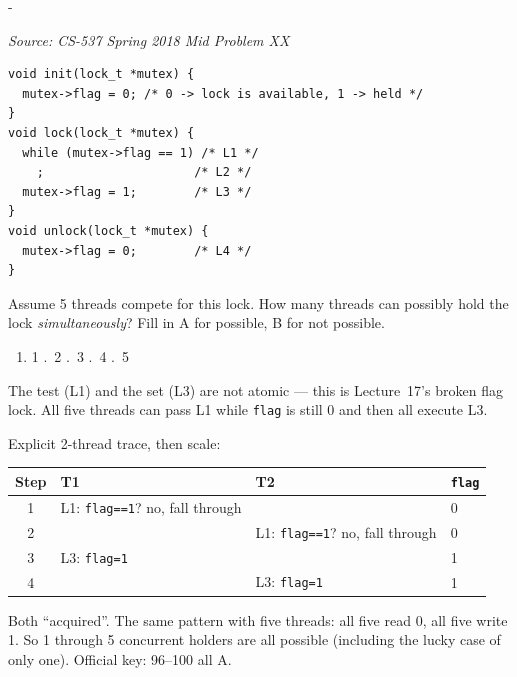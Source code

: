 \documentclass[11pt,a4paper]{article}
\makeatletter
\newcommand{\keepspace}[1]{\par\penalty-100\begingroup
  \setlength{\dimen@}{#1}\dimen@ii\pagegoal\advance\dimen@ii-\pagetotal
  \ifdim\dimen@>\dimen@ii\ifdim\dimen@ii>\z@\vfil\fi\break\fi\endgroup}
\newcounter{qn}[section]
\newenvironment{Qn}[4]{%
  \refstepcounter{qn}\keepspace{7\baselineskip}%
  \begin{tcolorbox}[qboxstyle, title={Q\thesection.\theqn\ \ [#1 \textbar\ #2]\ \ #4}]%
  {\footnotesize\color{g3}\textit{Source: #3}}\par\smallskip%
}{%
  \end{tcolorbox}%
}
\newenvironment{Sol}{%
  \begin{tcolorbox}[sboxstyle, title={Solution}]%
}{%
  \end{tcolorbox}\vspace{0.35em}%
}
\makeatother
\begin{document}
\begin{Qn}{Hard}{Lect 17}{CS-537 Spring 2018 Mid Problem XX}{Broken flag lock: how many threads get in?}
\begin{lstlisting}[numbers=none]
void init(lock_t *mutex) {
  mutex->flag = 0; /* 0 -> lock is available, 1 -> held */
}
void lock(lock_t *mutex) {
  while (mutex->flag == 1) /* L1 */
    ;                     /* L2 */
  mutex->flag = 1;        /* L3 */
}
void unlock(lock_t *mutex) {
  mutex->flag = 0;        /* L4 */
}
\end{lstlisting}

Assume 5 threads compete for this lock. How many threads can possibly hold the lock \emph{simultaneously}? Fill in A for possible, B for not possible.

\begin{enumerate}
\item[96.] 1 .~2 .~3 .~4 .~5
\end{enumerate}
\end{Qn}
\begin{Sol}
The test (L1) and the set (L3) are not atomic --- this is Lecture~17's broken flag lock. All five threads can pass L1 while \texttt{flag} is still 0 and then all execute L3.

Explicit 2-thread trace, then scale:

\begin{center}
\begin{tabular}{c|l|l|l}
Step & T1 & T2 & \texttt{flag} \\
\hline
1 & L1: \texttt{flag==1}? no, fall through & & 0 \\
2 & & L1: \texttt{flag==1}? no, fall through & 0 \\
3 & L3: \texttt{flag=1} & & 1 \\
4 & & L3: \texttt{flag=1} & 1 \\
\end{tabular}
\end{center}

Both ``acquired''. The same pattern with five threads: all five read 0, all five write 1. So 1 through 5 concurrent holders are all possible (including the lucky case of only one). Official key: 96--100 all A.
\end{Sol}
\end{document}
